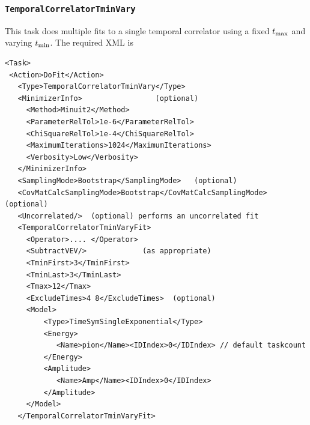 \documentclass[12pt]{article}
\newcommand{\vb}{\texttt}
\begin{document}
\subsubsection{\vb{TemporalCorrelatorTminVary}}

This task does multiple fits to a single temporal correlator using a fixed 
$t_{\rm max}$ and varying $t_{\rm min}$.  The required XML is
\begin{verbatim}
<Task>                                                                   
 <Action>DoFit</Action>                                                  
   <Type>TemporalCorrelatorTminVary</Type>                               
   <MinimizerInfo>                 (optional)                            
     <Method>Minuit2</Method>                                            
     <ParameterRelTol>1e-6</ParameterRelTol>                             
     <ChiSquareRelTol>1e-4</ChiSquareRelTol>                             
     <MaximumIterations>1024</MaximumIterations>                         
     <Verbosity>Low</Verbosity>                                          
   </MinimizerInfo>                                                      
   <SamplingMode>Bootstrap</SamplingMode>   (optional)                   
   <CovMatCalcSamplingMode>Bootstrap</CovMatCalcSamplingMode> (optional) 
   <Uncorrelated/>  (optional) performs an uncorrelated fit              
   <TemporalCorrelatorTminVaryFit>                                       
     <Operator>.... </Operator>                                          
     <SubtractVEV/>             (as appropriate)                         
     <TminFirst>3</TminFirst>                                            
     <TminLast>3</TminLast>                                              
     <Tmax>12</Tmax>                                                     
     <ExcludeTimes>4 8</ExcludeTimes>  (optional)                        
     <Model>                                                             
         <Type>TimeSymSingleExponential</Type>                           
         <Energy>                                                        
            <Name>pion</Name><IDIndex>0</IDIndex> // default taskcount   
         </Energy>                                                       
         <Amplitude>                                                     
            <Name>Amp</Name><IDIndex>0</IDIndex>                         
         </Amplitude>                                                    
     </Model>                                                            
   </TemporalCorrelatorTminVaryFit>                                      

\end{verbatim}
\end{document}

